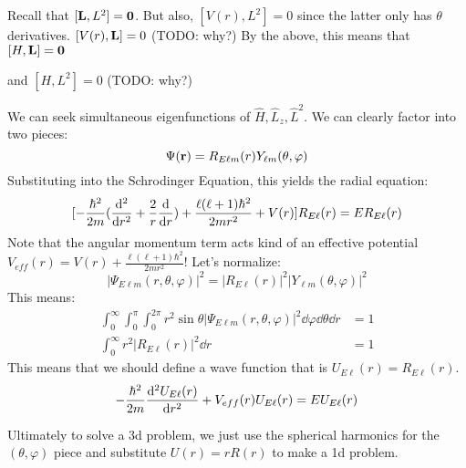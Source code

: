 Recall that $[\mathbf{L}, L^2] = \mathbf{0}$. But also, $[V(r), L^2] = 0$ since the latter only has $\theta$ derivatives.
$[V(r), \mathbf{L}] = 0$ (TODO: why?)
By the above, this means that $[H, \mathbf{L}] = \mathbf{0}$ 

and $[H, L^2] = 0$ (TODO: why?)

We can seek simultaneous eigenfunctions of $\hat{H}, \hat{L}_z, \hat{L}^2$. We can clearly factor into two pieces:
\[ \Psi(\mathbf{r}) = R_{E\ell m}(r) Y_{\ell m}(\theta, \varphi) \]
Substituting into the Schrodinger Equation, this yields the radial equation:
\[ [-\frac{\hbar^2}{2m}(\dv{^2}{r^2} + \frac{2}{r} \dv{}{r}) + \frac{\ell(\ell + 1)\hbar^2}{2mr^2} + V(r)] R_{E\ell}(r) = ER_{E\ell}(r) \]
Note that the angular momentum term acts kind of an effective potential $V_{eff}(r) = V(r) + \frac{\ell(\ell + 1)\hbar^2}{2mr^2}$! Let's normalize:
\[ |\Psi_{E\ell m}(r, \theta, \varphi)|^2 = |R_{E \ell}(r)|^2 |Y_{\ell m}(\theta, \varphi)|^2 \]
This means:
\begin{align*}
    \int_{0}^{\infty} \int_{0}^{\pi} \int_{0}^{2\pi} r^2 \sin\theta |\Psi_{E\ell m}(r, \theta, \varphi)|^2 \dd{\varphi} \dd{\theta} \dd{r} &= 1 \\
    \int_{0}^{\infty} r^2 |R_{E\ell}(r)|^2 \dd{r} &= 1
\end{align*}
This means that we should define a wave function that is $U_{E\ell}(r) = R_{E\ell}(r)$.
\[ -\frac{\hbar^2}{2m} \dv{^2 U_{E\ell}(r)}{r^2} + V_{eff}(r) U_{E \ell}(r) = E U_{E\ell}(r) \]

Ultimately to solve a 3d problem, we just use the spherical harmonics for the $(\theta, \varphi)$ piece
and substitute $U(r) = r R(r)$ to make a 1d problem.

